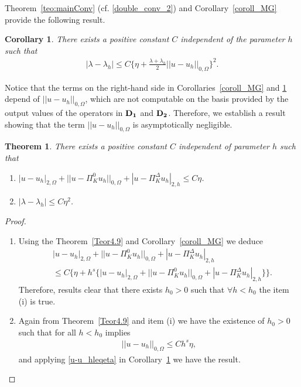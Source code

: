 \documentclass[final,reqno]{elsarticle}
\newtheorem{theorem}{Theorem}[section]
\newtheorem{corollary}{Corollary}[section]
\def\O{\Omega}
\def\PiK{\Pi_{K}^{\Delta}}
\begin{document}
Theorem~\ref{teo:mainConv} (cf. \eqref{double_conv_2}) and Corollary~\ref{coroll_MG} provide the following result. 
\begin{corollary}\label{coro_l-l_h}
	There exists a positive constant $C$ independent of the parameter $h$ such that 
	\begin{align*}
		|\lambda - \lambda_h|\leq C\Bigg\{\eta +\frac{\lambda+\lambda_h}{2}||u-u_h ||_{0,\O} \Bigg\}^2.
	\end{align*}
\end{corollary}
Notice that the terms on the right-hand side in Corollaries~\ref{coroll_MG} and \ref{coro_l-l_h} depend of $||u-u_h ||_{0,\Omega}$, which are not computable on the basis provided by the output values of the operators in ${\bf D_1}$ and ${\bf D_2}$. Therefore, we establish a result showing that the term $||u - u_h||_{0,\Omega}$ is asymptotically negligible.
\begin{theorem}\label{th:reliability}
	There exists a positive constant $C$ independent of parameter $h$ such that
	\begin{enumerate}
		\item[(i)] \quad $|u-u_h|_{2,\O}+||u-\Pi_K^0  u_h ||_{0,\Omega}+|u-\PiK u_h|_{2,h}\leq C\eta$.
		\item[(ii)] \quad $|\lambda - \lambda_h|\leq C\eta^2$.
	\end{enumerate}
\end{theorem}
\begin{proof}
	\begin{enumerate}
		\item[(i)] Using the Theorem~\ref{Teor4.9} and Corollary~\ref{coroll_MG} we deduce
		\begin{align*}
			&|u-u_h|_{2,\O}+||u-\Pi_K^0  u_h ||_{0,\Omega}+|u-\PiK u_h|_{2,h}\\
			&\leq C\Bigg\{\eta + h^s\Big\{|u-u_h|_{2,\O}+||u-\Pi_K^0  u_h ||_{0,\Omega}+|u-\PiK u_h|_{2,h}\Big\}\Bigg\}.
		\end{align*}
		Therefore, results clear that there exists $h_0>0$ such that $\forall h<h_0$ the item (i) is true.
	\item[(ii)] Again from Theorem~\ref{Teor4.9} and item (i) we have the existence of $h_0>0$ such that for all $h<h_0$ implies
		\begin{align}
			||u-u_h ||_{0,\O}\leq Ch^s\eta, \label{u-u_hleqeta}
		\end{align} 
		and applying \eqref{u-u_hleqeta} in  Corollary~\ref{coro_l-l_h} we have the result. 
	\end{enumerate}
\end{proof}
\end{document}
